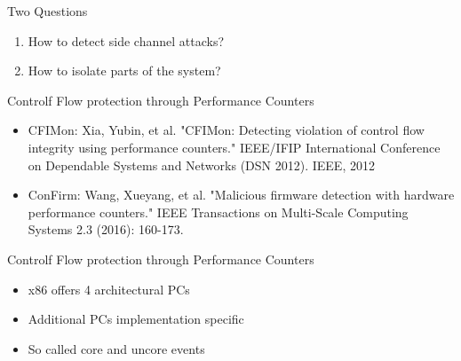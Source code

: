 \documentclass[aspectratio=169]{beamer}
\begin{document}
\begin{frame}{Two Questions}
    \begin{enumerate}
        \item How to detect side channel attacks?
              \bigskip
        \item How to isolate parts of the system?
    \end{enumerate}
\end{frame}
\begin{frame}{Controlf Flow protection through Performance Counters}
    \begin{itemize}
        \item CFIMon: Xia, Yubin, et al. "CFIMon: Detecting violation of control flow integrity using performance counters." {\footnotesize{IEEE/IFIP International Conference on Dependable Systems and Networks (DSN 2012). IEEE, 2012}}
        \item ConFirm: Wang, Xueyang, et al. "Malicious firmware detection with hardware performance counters." {\footnotesize{IEEE Transactions on Multi-Scale Computing Systems 2.3 (2016): 160-173.}}
    \end{itemize}
\end{frame}
\begin{frame}{Controlf Flow protection through Performance Counters}
    \begin{itemize}
        \item x86 offers 4 architectural PCs
        \item Additional PCs implementation specific
        \item So called core and uncore events
    \end{itemize}
\end{frame}
\end{document}
